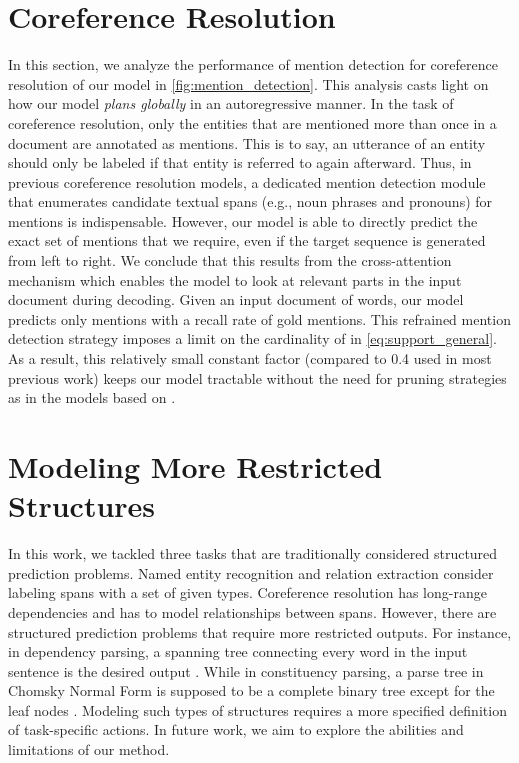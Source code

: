\documentclass[11pt]{article}
\begin{document}
\section{Coreference Resolution} \label{appendix:mention_recall}
In this section, we analyze the performance of mention detection for coreference resolution of our model in \cref{fig:mention_detection}. This analysis casts light on how our model \emph{plans globally} in an autoregressive manner.
In the task of coreference resolution, only the entities that are mentioned more than once in a document are annotated as mentions. This is to say, an utterance of an entity should only be labeled if that entity is referred to again afterward. Thus, in previous coreference resolution models, a dedicated mention detection module that enumerates candidate textual spans (e.g., noun phrases and pronouns) for mentions is indispensable. 
However, our model is able to directly predict the exact set of mentions that we require, even if the target sequence is generated from left to right. We conclude that this results from the cross-attention mechanism which enables the model to look at relevant parts in the input document during decoding.
Given an input document of  words, our model predicts only  mentions with a  recall rate of gold mentions. This refrained mention detection strategy imposes a limit on the cardinality of  in \cref{eq:support_general}. As a result, this relatively small constant factor (compared to 0.4 used in most previous work) keeps our model tractable without the need for pruning strategies as in the models based on \cite{lee-etal-2017-end}. 


\section{Modeling More Restricted Structures} \label{appendix:parsing}
In this work, we tackled three tasks that are traditionally considered structured prediction problems. Named entity recognition and relation extraction consider labeling spans with a set of given types. 
Coreference resolution has long-range dependencies and has to model relationships between spans. 
However, there are structured prediction problems that require more restricted outputs. For instance, in dependency parsing, a spanning tree connecting every word in the input sentence is the desired output \cite{dependencyparsing}. While in constituency parsing, a parse tree in Chomsky Normal Form is supposed to be a complete binary tree except for the leaf nodes \cite{handbook-clnlp}.
Modeling such types of structures requires a more specified definition of task-specific actions. In future work, we aim to explore the abilities and limitations of our method.
\end{document}
